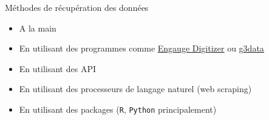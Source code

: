\documentclass[
  ignorenonframetext,
]{beamer}
\providecommand{\tightlist}{%
  \setlength{\itemsep}{0pt}\setlength{\parskip}{0pt}}
\begin{document}
\begin{frame}[fragile]{Méthodes de récupération des données}
\protect\hypertarget{muxe9thodes-de-ruxe9cupuxe9ration-des-donnuxe9es}{}
\begin{itemize}
\tightlist
\item
  A la main
\item
  En utilisant des programmes comme
  \href{http://markummitchell.github.io/engauge-digitizer/}{Engauge
  Digitizer} ou \href{https://github.com/pn2200/g3data}{g3data}
\item
  En utilisant des API
\item
  En utilisant des processeurs de langage naturel (web scraping)
\item
  En utilisant des packages (\texttt{R}, \texttt{Python} principalement)
\end{itemize}
\end{frame}
\end{document}
